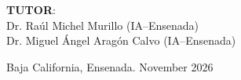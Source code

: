 \documentclass[12pt, oneside]{article}
\begin{document}
\begin{titlepage}
\begin{center}
\begin{center}
				\bigskip
				
				\textbf{TUTOR}: \\
				Dr. Ra\'ul Michel Murillo (IA--Ensenada) \\
				Dr. Miguel \'Angel Arag\'on Calvo (IA--Ensenada)
			\end{center}
			
			\vfill
			
			\begin{center}
				{Baja California, Ensenada. November 2026}\\
			\end{center}
			\cleardoublepage
		\end{center}
	\end{titlepage}

	

	\printbibliography
\end{document}
